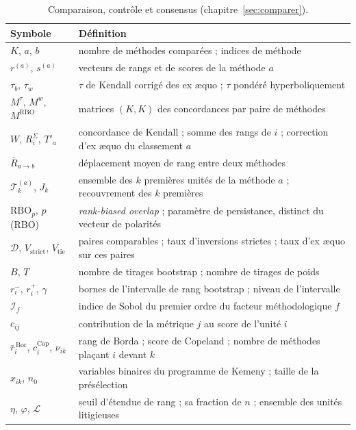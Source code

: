 \documentclass[11pt,a4paper]{article}
\theoremstyle{definition}
\theoremstyle{remark}
\begin{document}
\bigskip

\begin{table}[htbp]
  \centering
  \small
  \renewcommand{\arraystretch}{1.2}
  \begin{tabularx}{\textwidth}{@{}l X@{}}
    \toprule
    \textbf{Symbole} & \textbf{Définition} \\
    \midrule
    $K$, $a$, $b$ & nombre de méthodes comparées ; indices de méthode \\
    $r^{(a)}$, $s^{(a)}$ & vecteurs de rangs et de scores de la méthode $a$ \\
    $\tau_b$, $\tau_w$ & $\tau$ de Kendall corrigé des ex \ae quo ; $\tau$ pondéré
      hyperboliquement \citep{vigna2015} \\
    $M^\tau$, $M^{w}$, $M^{\mathrm{RBO}}$ & matrices $(K,K)$ des concordances par paire de
      méthodes \\
    $W$, $R^\Sigma_i$, $T'_a$ & concordance de Kendall ; somme des rangs de $i$ ; correction
      d'ex \ae quo du classement $a$ \\
    $\bar{R}_{a\to b}$ & déplacement moyen de rang entre deux méthodes \\
    $\mathcal{T}^{(a)}_k$, $J_k$ & ensemble des $k$ premières unités de la méthode $a$ ;
      recouvrement des $k$ premières \\
    $\mathrm{RBO}_p$, $p$ (RBO) & \emph{rank-biased overlap} ; paramètre de persistance,
      distinct du vecteur de polarités \\
    $\mathcal{D}$, $V_{\mathrm{strict}}$, $V_{\mathrm{tie}}$ & paires comparables ; taux
      d'inversions strictes ; taux d'ex \ae quo sur ces paires \\
    $B$, $T$ & nombre de tirages bootstrap ; nombre de tirages de poids \\
    $r^-_i$, $r^+_i$, $\gamma$ & bornes de l'intervalle de rang bootstrap ; niveau de
      l'intervalle \\
    $\mathcal{I}_f$ & indice de Sobol du premier ordre du facteur méthodologique $f$ \\
    $c_{ij}$ & contribution de la métrique $j$ au score de l'unité $i$ \\
    $\bar{r}^{\,\mathrm{Bor}}_i$, $c^{\mathrm{Cop}}_i$, $\nu_{ik}$ & rang de Borda ; score
      de Copeland ; nombre de méthodes plaçant $i$ devant $k$ \\
    $x_{ik}$, $n_0$ & variables binaires du programme de Kemeny ; taille de la présélection \\
    $\eta$, $\varphi$, $\mathcal{L}$ & seuil d'étendue de rang ; sa fraction de $n$ ;
      ensemble des unités litigieuses \\
    \bottomrule
  \end{tabularx}
  \caption{Comparaison, contrôle et consensus (chapitre~\ref{sec:comparer}).}
  \label{tab:notations-comparaison}
\end{table}
\end{document}
